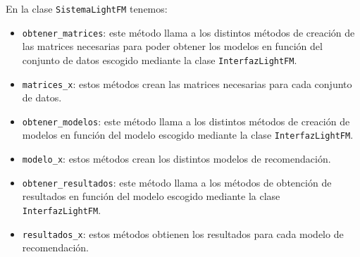 En la clase \texttt{SistemaLightFM} tenemos:
\begin{itemize}
\tightlist
\item \texttt{obtener\_matrices}: este método llama a los distintos métodos de creación de las matrices necesarias para poder obtener los modelos en función del conjunto de datos escogido mediante la clase \texttt{InterfazLightFM}.
\item \texttt{matrices\_x}: estos métodos crean las matrices necesarias para cada conjunto de datos. 
\item \texttt{obtener\_modelos}: este método llama a los distintos métodos de creación de modelos en función del modelo escogido mediante la clase \texttt{InterfazLightFM}.
\item \texttt{modelo\_x}: estos métodos crean los distintos modelos de recomendación. 
\item \texttt{obtener\_resultados}: este método llama a los métodos de obtención de resultados en función del modelo escogido mediante la clase \texttt{InterfazLightFM}. 
\item \texttt{resultados\_x}: estos métodos obtienen los resultados para cada modelo de recomendación. 
\end{itemize}



